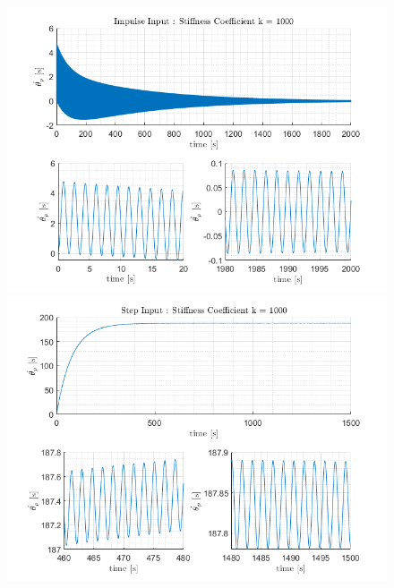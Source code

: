 \documentclass[letterpaper,12pt]{article}
\begin{document}
\begin{figure}[ht]
    \centering
    \includegraphics[scale = .8]{Images/Impulse_k1000.png}
    \includegraphics[scale = .8]{Images/StepInput_k1000.png}
\end{figure}
\end{document}
